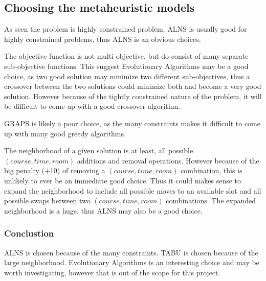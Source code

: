 \subsection{Choosing the metaheuristic models}

As seen the problem is highly constrained problem. ALNS is usually good for highly constrained problems, thus ALNS is an obvious choices.

The objective function is not multi objective, but do consist of many separate sub-objective functions. This suggest Evolutionary Algorithms may be a good choice, as two good solution may minimize two different sub-objectives, thus a crossover between the two solutions could minimize both and become a very good solution. However because of the tightly constrained nature of the problem, it will be difficult to come up with a good crossover algorithm.

GRAPS is likely a poor choice, as the many constraints makes it difficult to come up with many good greedy algorithms.

The neighborhood of a given solution is at least, all possible $(course, time, room)$ additions and removal operations. However because of the big penalty (+10) of removing a $(course, time, room)$ combination, this is unlikely to ever be an immediate good choice. Thus it could makes sense to expand the neighborhood to include all possible moves to an available slot and all possible swaps between two $(course, time, room)$ combinations. The expanded neighborhood is a huge, thus ALNS may also be a good choice.

\subsubsection{Conclustion}

ALNS is chosen because of the many constraints. TABU is chosen because of the large neighborhood. Evolutionary Algorithms is an interesting choice and may be worth investigating, however that is out of the scope for this project.
